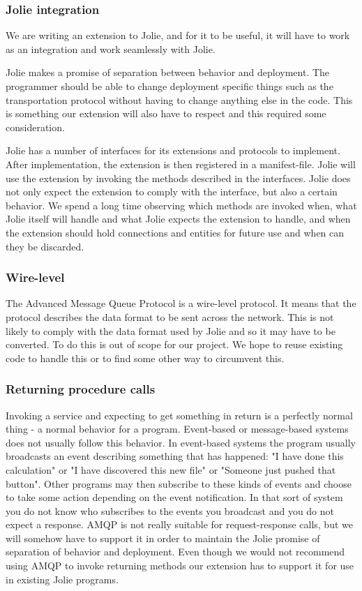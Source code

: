 \subsubsection{Jolie integration}
\label{subsubsec:Jolie integration}
We are writing an extension to Jolie, and for it to be useful, it will have to work as an integration and work seamlessly with Jolie.

Jolie makes a promise of separation between behavior and deployment. The programmer should be able to change deployment specific things such as the transportation protocol without having to change anything else in the code. This is something our extension will also have to respect and this required some consideration.

Jolie has a number of interfaces for its extensions and protocols to implement. After implementation, the extension is then registered in a manifest-file. Jolie will use the extension by invoking the methods described in the interfaces. Jolie does not only expect the extension to comply with the interface, but also a certain behavior. We spend a long time observing which methods are invoked when, what Jolie itself will handle and what Jolie expects the extension to handle, and when the extension should hold connections and entities for future use and when can they be discarded.
\subsubsection{Wire-level}
The Advanced Message Queue Protocol is a wire-level protocol. It means that the protocol describes the data format to be sent across the network. This is not likely to comply with the data format used by Jolie and so it may have to be converted. To do this is out of scope for our project. We hope to reuse existing code to handle this or to find some other way to circumvent this.
\subsubsection{Returning procedure calls}
Invoking a service and expecting to get something in return is a perfectly normal thing - a normal behavior for a program. Event-based or message-based systems does not usually follow this behavior. In event-based systems the program usually broadcasts an event describing something that has happened: "I have done this calculation" or "I have discovered this new file" or "Someone just pushed that button". Other programs may then subscribe to these kinds of events and choose to take some action depending on the event notification. In that sort of system you do not know who subscribes to the events you broadcast and you do not expect a response. AMQP is not really suitable for request-response calls, but we will somehow have to support it in order to maintain the Jolie promise of separation of behavior and deployment. Even though we would not recommend using AMQP to invoke returning methods our extension has to support it for use in existing Jolie programs.
